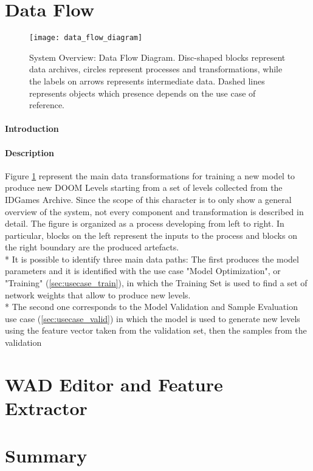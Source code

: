 \section{Data Flow}
\label{sec:dataflow}
\begin{figure}[h!]
	\begin{center}
		\texttt{[image: data\_flow\_diagram]}
	\end{center}
	
	\captionsetup{width=\linewidth}
	\caption[System Overview: Data Flow Diagram]{System Overview: Data Flow Diagram. Disc-shaped blocks represent data archives, circles represent processes and transformations, while the labels on arrows represents intermediate data. Dashed lines represents objects which presence depends on the use case of reference.}
	\label{fig:dataflow}
\end{figure}

\paragraph{Introduction} 
\paragraph{Description} Figure \ref{fig:dataflow} represent the main data transformations for training a new model to produce new DOOM Levels starting from a set of levels collected from the IDGames Archive. Since the scope of this character is to only show a general overview of the system, not every component and transformation is described in detail. The figure is organized as a process developing from left to right. In particular, blocks on the left represent the inputs to the process and blocks on the right boundary are the produced artefacts. \\* 
It is possible to identify three main data paths: The first produces the model parameters and it is identified with the use case "Model Optimization", or "Training" (\ref{sec:usecase_train}), in which the Training Set is used to find a set of network weights that allow to produce new levels. \\* The second one corresponds to the Model Validation and Sample Evaluation use case (\ref{sec:usecase_valid}) in which the model is used to generate new levels using the feature vector taken from the validation set, then the samples from the validation

\section{WAD Editor and Feature Extractor}

\section{Summary}
